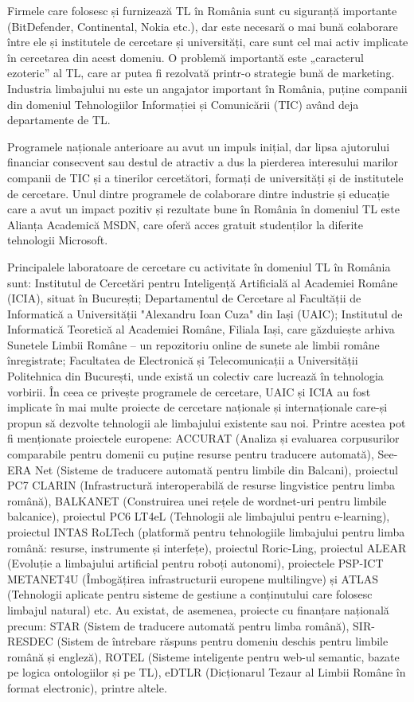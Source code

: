\begin{multicols}{2}
Firmele care folosesc și furnizează TL în România sunt cu siguranță importante (BitDefender, Continental, Nokia etc.), dar este necesară o mai bună colaborare între ele și institutele de cercetare și universități, care sunt cel mai activ implicate în cercetarea din acest domeniu. O problemă importantă este „caracterul ezoteric” al TL, care ar putea fi rezolvată printr-o strategie bună de marketing. Industria limbajului nu este un angajator important în România, puține companii din domeniul Tehnologiilor Informației și Comunicării (TIC) având deja departamente de TL.

Programele naționale anterioare au avut un impuls inițial, dar lipsa ajutorului financiar consecvent sau destul de atractiv a dus la pierderea interesului marilor companii de TIC și a tinerilor cercetători, formați de universități și de institutele de cercetare. Unul dintre programele de colaborare dintre industrie și educație care a avut un impact pozitiv și rezultate bune în România în domeniul TL este Alianța Academică MSDN, care oferă acces gratuit studenților la diferite tehnologii Microsoft. 

Principalele laboratoare de cercetare cu activitate în domeniul TL în România sunt: Institutul de Cercetări pentru Inteligență Artificială al Academiei Române (ICIA), situat în București; Departamentul de Cercetare al Facultății de Informatică a Universității "Alexandru Ioan Cuza" din Iași (UAIC); Institutul de Informatică Teoretică al Academiei Române, Filiala Iași, care găzduiește arhiva Sunetele Limbii Române – un repozitoriu online de sunete ale limbii române înregistrate; Facultatea de Electronică și Telecomunicații a Universității Politehnica din București, unde există un colectiv care lucrează în tehnologia vorbirii. În ceea ce privește programele de cercetare, UAIC și ICIA au fost implicate în mai multe proiecte de cercetare naționale și internaționale care-și propun să dezvolte tehnologii ale limbajului existente sau noi. Printre acestea pot fi menționate proiectele europene: ACCURAT (Analiza și evaluarea corpusurilor comparabile pentru domenii cu puține resurse pentru traducere automată), See-ERA Net (Sisteme de traducere automată pentru limbile din Balcani), proiectul PC7 CLARIN (Infrastructură interoperabilă de resurse lingvistice pentru limba română), BALKANET (Construirea unei rețele de wordnet-uri pentru limbile balcanice), proiectul PC6 LT4eL (Tehnologii ale limbajului pentru e-learning), proiectul INTAS RoLTech (platformă pentru tehnologiile limbajului pentru limba română: resurse, instrumente și interfețe), proiectul Roric-Ling, proiectul ALEAR (Evoluție a limbajului artificial pentru roboți autonomi), proiectele PSP-ICT METANET4U (Îmbogățirea infrastructurii europene multilingve) și ATLAS (Tehnologii aplicate pentru sisteme de gestiune a conținutului care folosesc limbajul natural) etc. Au existat, de asemenea, proiecte cu finanțare națională precum: STAR (Sistem de traducere automată pentru limba română), SIR-RESDEC (Sistem de întrebare răspuns pentru domeniu deschis pentru limbile română și engleză), ROTEL (Sisteme inteligente pentru web-ul semantic, bazate pe logica ontologiilor și pe TL), eDTLR (Dicționarul Tezaur al Limbii Române în format electronic), printre altele.


\end{multicols}
